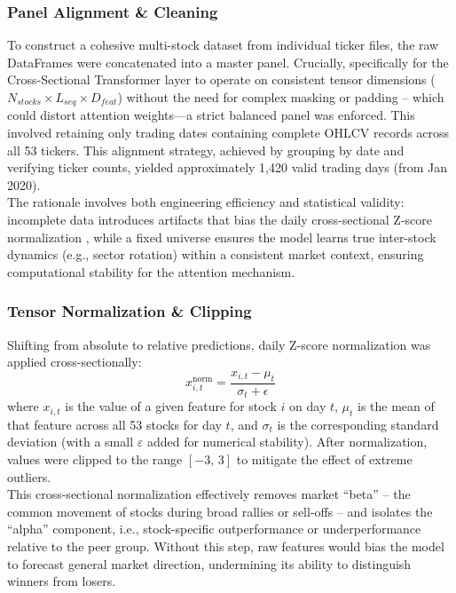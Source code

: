 \documentclass[twoside,final]{hcmut-report}
\newcommand{\result}[1]{\fcolorbox{red}{white}{#1}}
\begin{document}
\subsubsection{Panel Alignment \& Cleaning}
To construct a cohesive multi-stock dataset from individual ticker files, the raw DataFrames were concatenated into a master panel. Crucially, specifically for the Cross-Sectional Transformer layer to operate on consistent tensor dimensions ($N_{stocks} \times L_{seq} \times D_{feat}$) without the need for complex masking or padding -- which could distort attention weights—a strict balanced panel was enforced. This involved retaining only trading dates containing complete OHLCV records across all 53 tickers. This alignment strategy, achieved by grouping by date and verifying ticker counts, yielded approximately 1,420 valid trading days (from Jan 2020).\\

The rationale involves both engineering efficiency and statistical validity: incomplete data introduces artifacts that bias the daily cross-sectional Z-score normalization \result{Section~\ref{section_3.3.5}}, while a fixed universe ensures the model learns true inter-stock dynamics (e.g., sector rotation) within a consistent market context, ensuring computational stability for the attention mechanism.

\subsubsection{Tensor Normalization \& Clipping}
Shifting from absolute to relative predictions, daily Z-score normalization was applied cross-sectionally:
\[
  x_{i,t}^{\text{norm}} = \frac{x_{i,t} - \mu_t}{\sigma_t + \epsilon}
\]
where $x_{i,t}$ is the value of a given feature for stock $i$ on day $t$, $\mu_t$ is the mean of that feature across all 53 stocks for day $t$, and $\sigma_t$ is the corresponding standard deviation (with a small $\varepsilon$ added for numerical stability). After normalization, values were clipped to the range $[-3,\, 3]$ to mitigate the effect of extreme outliers.\\

This cross-sectional normalization effectively removes market ``beta'' -- the common movement of stocks during broad rallies or sell-offs -- and isolates the ``alpha'' component, i.e., stock-specific outperformance or underperformance relative to the peer group. Without this step, raw features would bias the model to forecast general market direction, undermining its ability to distinguish winners from losers.\\
\end{document}
